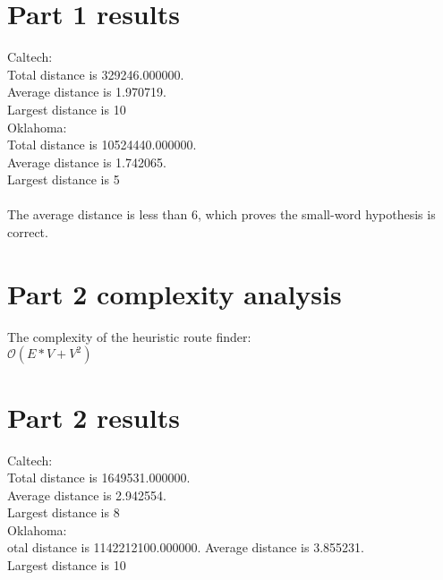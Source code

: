 \documentclass{article}
\begin{document}
\section{Part 1 results}
\label{sec:part1}
Caltech:\\
Total distance is 329246.000000.\\
Average distance is 1.970719.\\
Largest distance is 10\\
Oklahoma:\\
Total distance is 10524440.000000.\\
Average distance is 1.742065.\\
Largest distance is 5\\
\\
The average distance is less than 6, which proves the small-word hypothesis is correct. \\



\section{Part 2 complexity analysis}
\label{sec:complexity2}
The complexity of the heuristic route finder:\\
$\mathcal{O}(E*V+V^{2})$

\section{Part 2 results}
\label{sec:part2}
Caltech:\\
Total distance is 1649531.000000.\\
Average distance is 2.942554.\\
Largest distance is 8\\
Oklahoma:\\
otal distance is 1142212100.000000.
Average distance is 3.855231.\\
Largest distance is 10\\
\end{document}
